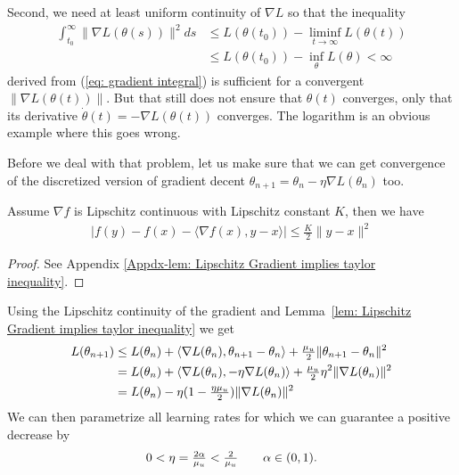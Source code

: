Second, we need at least uniform continuity of \(\nabla L\) so that the inequality
%
\begin{align}\label{eq: bounded gradient integral}
	\int_{t_0}^\infty \|\nabla L(\theta(s))\|^2 ds
	&\le L(\theta(t_0)) - \liminf_{t\to\infty} L(\theta(t)) \\
	&\le L(\theta(t_0)) - \inf_{\theta} L(\theta) < \infty \nonumber
\end{align}
%
derived from (\ref{eq: gradient integral}) is sufficient for a convergent
\(\|\nabla L(\theta(t))\|\). But that still does not ensure that \(\theta(t)\)
converges, only that its derivative \(\dot{\theta}(t) = -\nabla L(\theta(t))\)
converges. The logarithm is an obvious example where this goes wrong.

Before we deal with that problem, let us make sure that we can get convergence
of the discretized version of gradient decent \(\theta_{n+1}=\theta_n-\eta\nabla
L(\theta_n)\) too. 
%
\begin{lemma}
	\label{lem: Lipschitz Gradient implies taylor inequality}
	Assume \(\nabla f\) is Lipschitz continuous with Lipschitz constant \(K\),
	then we have
	\begin{align*}
		| f(y) - f(x) - \langle \nabla f(x), y-x\rangle | \le \tfrac{K}2 \|y-x\|^2
	\end{align*}
\end{lemma}
\begin{proof}
	See Appendix \ref{Appdx-lem: Lipschitz Gradient implies taylor inequality}.
\end{proof}
%
\noindent
Using the Lipschitz continuity of the gradient and Lemma~\ref{lem: Lipschitz
Gradient implies taylor inequality} we get
%
\begin{align}
	L(\theta_{n+1})
	&\le L(\theta_n) 
	+ \langle\nabla L(\theta_n),\theta_{n+1} - \theta_n\rangle
	+ \tfrac{\mu_u}{2} \| \theta_{n+1} - \theta_n\|^2 
	\label{bound increment}\\
	&= L(\theta_n)
	+ \langle\nabla L(\theta_n), -\eta\nabla L(\theta_n)\rangle
	+ \tfrac{\mu_u}{2}\eta^2\| \nabla L(\theta_n)\|^2
	\nonumber\\
	&=L(\theta_n) - \eta(1-\tfrac{\eta \mu_u}{2})\|\nabla L(\theta_n)\|^2
	\nonumber
\end{align}
%
We can then parametrize all learning rates for which we can guarantee a positive
decrease by
\begin{align}\label{learning rate restrictions}
	0<\eta=\tfrac{2\alpha}{\mu_u}<\tfrac2{\mu_u} \qquad \alpha \in (0,1).
\end{align}
